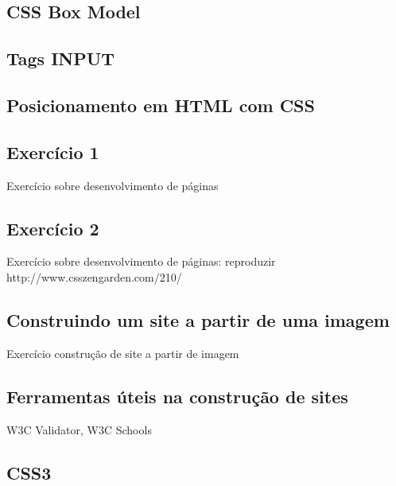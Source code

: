 \subsection{CSS Box Model}

\subsection{Tags INPUT}

\subsection{Posicionamento em HTML com CSS}

\subsection{Exercício 1}
Exercício sobre desenvolvimento de páginas

\subsection{Exercício 2}
Exercício sobre desenvolvimento de páginas: reproduzir http://www.csszengarden.com/210/

\subsection{Construindo um site a partir de uma imagem}
Exercício construção de site a partir de imagem

\subsection{Ferramentas úteis na construção de sites}
W3C Validator, W3C Schools

\subsection{CSS3}
